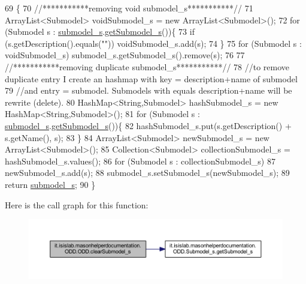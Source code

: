 \begin{DoxyCode}
69                                                 \{
70         \textcolor{comment}{//***********removing void submodel\_s***********//}
71         ArrayList<Submodel> voidSubmodel\_s = \textcolor{keyword}{new} ArrayList<Submodel>();
72         \textcolor{keywordflow}{for} (Submodel s : \hyperlink{classit_1_1isislab_1_1masonhelperdocumentation_1_1_o_d_d_1_1_o_d_d_a1da5e6dcf76e4a83ec91831f5ab98bf2}{submodel\_s}.\hyperlink{classit_1_1isislab_1_1masonhelperdocumentation_1_1_o_d_d_1_1_submodel__s_afe2141a5dacaecbbfc44a3d4d10a9d37}{getSubmodel\_s}())\{
73             \textcolor{keywordflow}{if} (s.getDescription().equals(\textcolor{stringliteral}{""}))  voidSubmodel\_s.add(s);
74         \}
75         \textcolor{keywordflow}{for} (Submodel s : voidSubmodel\_s)   submodel\_s.getSubmodel\_s().\textcolor{keyword}{remove}(s);
76         
77         \textcolor{comment}{//***********removing duplicate submodel\_s***********//}
78         \textcolor{comment}{//to remove duplicate entry I create an hashmap with key = description+name of submodel}
79         \textcolor{comment}{//and entry = submodel. Submodels with equals description+name will be rewrite (delete).}
80         HashMap<String,Submodel> hashSubmodel\_s = \textcolor{keyword}{new} HashMap<String,Submodel>();
81         \textcolor{keywordflow}{for} (Submodel s : \hyperlink{classit_1_1isislab_1_1masonhelperdocumentation_1_1_o_d_d_1_1_o_d_d_a1da5e6dcf76e4a83ec91831f5ab98bf2}{submodel\_s}.\hyperlink{classit_1_1isislab_1_1masonhelperdocumentation_1_1_o_d_d_1_1_submodel__s_afe2141a5dacaecbbfc44a3d4d10a9d37}{getSubmodel\_s}())\{
82             hashSubmodel\_s.put(s.getDescription() + s.getName(), s);
83         \}
84         ArrayList<Submodel> newSubmodel\_s = \textcolor{keyword}{new} ArrayList<Submodel>();
85         Collection<Submodel> collectionSubmodel\_s = hashSubmodel\_s.values();
86         \textcolor{keywordflow}{for} (Submodel s : collectionSubmodel\_s)
87             newSubmodel\_s.add(s);
88         submodel\_s.setSubmodel\_s(newSubmodel\_s);
89         \textcolor{keywordflow}{return} \hyperlink{classit_1_1isislab_1_1masonhelperdocumentation_1_1_o_d_d_1_1_o_d_d_a1da5e6dcf76e4a83ec91831f5ab98bf2}{submodel\_s};
90     \}
\end{DoxyCode}


Here is the call graph for this function\-:\nopagebreak
\begin{figure}[H]
\begin{center}
\leavevmode
\includegraphics[width=350pt]{classit_1_1isislab_1_1masonhelperdocumentation_1_1_o_d_d_1_1_o_d_d_a967fd254c4e555432b7dba443855922e_cgraph}
\end{center}
\end{figure}




